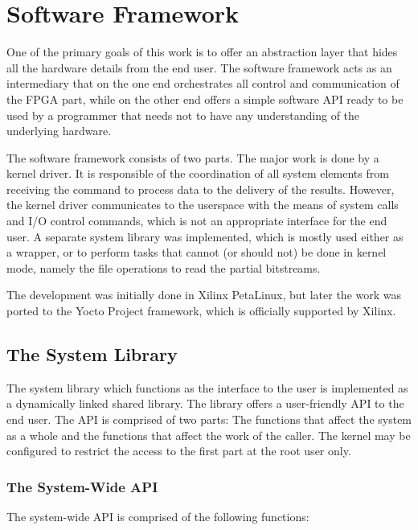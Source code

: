 \chapter{Software Framework}

One of the primary goals of this work is to offer an abstraction layer that hides
all the hardware details from the end user. The software framework acts as an intermediary
that on the one end orchestrates all control and communication of the FPGA part, while
on the other end offers a simple software API ready to be used by a programmer that needs not
to have any understanding of the underlying hardware.

The software framework consists of two parts. The major work is done by a kernel driver.
It is responsible of the coordination of all system elements from receiving the command
to process data to the delivery of the results. However, the kernel driver communicates
to the userspace with the means of system calls and I/O control commands, which is not
an appropriate interface for the end user. A separate system library was implemented,
which is mostly used either as a wrapper, or to perform tasks that cannot (or should not)
be done in kernel mode, namely the file operations to read the partial bitstreams.

The development was initially done in Xilinx PetaLinux, but later the work was
ported to the Yocto Project framework, which is officially supported by Xilinx.

\section{The System Library}

The system library which functions as the interface to the user
is implemented as a dynamically linked shared library.
The library offers a user-friendly API to the end user. The API is comprised
of two parts: The functions that affect the system as a whole and the functions
that affect the work of the caller. The kernel may be configured to restrict the access
to the first part at the root user only.


\subsection{The System-Wide API}

The system-wide API is comprised of the following functions:

